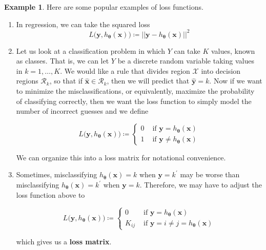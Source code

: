 \documentclass{article}
\theoremstyle{definition}
\newtheorem{example}{Example}[section]
\begin{document}
    \begin{example}
      Here are some popular examples of loss functions. 
      \begin{enumerate}
        \item In regression, we can take the squared loss
          \[L\big( \mathbf{y}, h_{\boldsymbol{\theta}} (\mathbf{x}) \big) \coloneqq || \mathbf{y} - h_{\boldsymbol{\theta}} (\mathbf{x}) ||^2\]

        \item Let us look at a classification problem in which $Y$ can take $K$ values, known as classes. That is, we can let $Y$ be a discrete random variable taking values in $k = 1, \ldots, K$. We would like a rule that divides region $\mathcal{X}$ into decision regions $\mathcal{R}_k$, so that if $\hat{\mathbf{x}} \in \mathcal{R}_k$, then we will predict that $\hat{\mathbf{y}} = k$. Now if we want to minimize the misclassifications, or equivalently, maximize the probability of classifying correctly, then we want the loss function to simply model the number of incorrect guesses and we define 

          \[L\big( \mathbf{y}, h_{\boldsymbol{\theta}} (\mathbf{x}) \big) \coloneqq \begin{cases} 0 & \text{ if } \mathbf{y} = h_{\boldsymbol{\theta}} (\mathbf{x}) \\ 1 & \text{ if } \mathbf{y} \neq h_{\boldsymbol{\theta}} (\mathbf{x}) \end{cases}\]

        We can organize this into a loss matrix for notational convenience.  

        \item Sometimes, misclassifying $h_{\boldsymbol{\theta}} (\mathbf{x}) = k$ when $\mathbf{y} = k^\prime$ may be worse than misclassifying $h_{\boldsymbol{\theta}} (\mathbf{x}) = k^\prime$ when $\mathbf{y} = k$. Therefore, we may have to adjust the loss function above to 

          \[L\big( \mathbf{y}, h_{\boldsymbol{\theta}} (\mathbf{x}) \big) \coloneqq \begin{cases} 0 & \text{ if } \mathbf{y} = h_{\boldsymbol{\theta}} (\mathbf{x}) \\ K_{ij} & \text{ if } \mathbf{y} = i \neq j = h_{\boldsymbol{\theta}} (\mathbf{x})\end{cases}\]

        which gives us a \textbf{loss matrix}. 
      \end{enumerate}
    \end{example}
\end{document}
